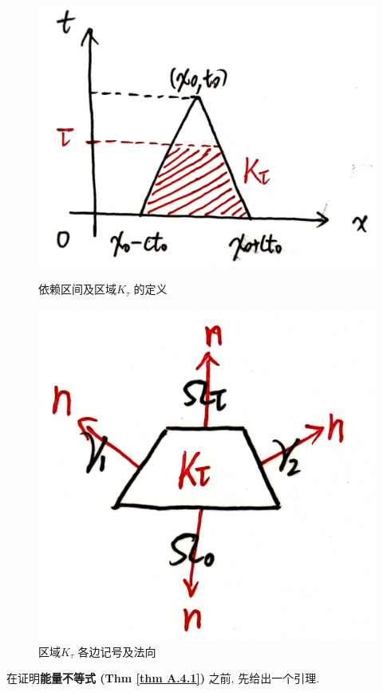 \begin{thm}
		\begin{figure}[thbp!]
			\centering
			\begin{minipage}[t]{0.59\linewidth}
				\centering
				\includegraphics[width=0.65\linewidth]{figure/2.3-4}
				\caption{依赖区间及区域$K_\tau$ 的定义}
				\label{fig : A.4-1}
			\end{minipage}
			\begin{minipage}[t]{0.39\linewidth}
				\centering
				\includegraphics[width=0.55\linewidth]{figure/2.3-5}
				\caption{区域$K_\tau$ 各边记号及法向}
				\label{fig : A.4-2}
			\end{minipage}
		\end{figure}
	\end{thm}
	
	\newpage
	
	在证明\textbf{能量不等式 (Thm \ref{thm A.4.1})} 之前, 先给出一个引理. 
	
